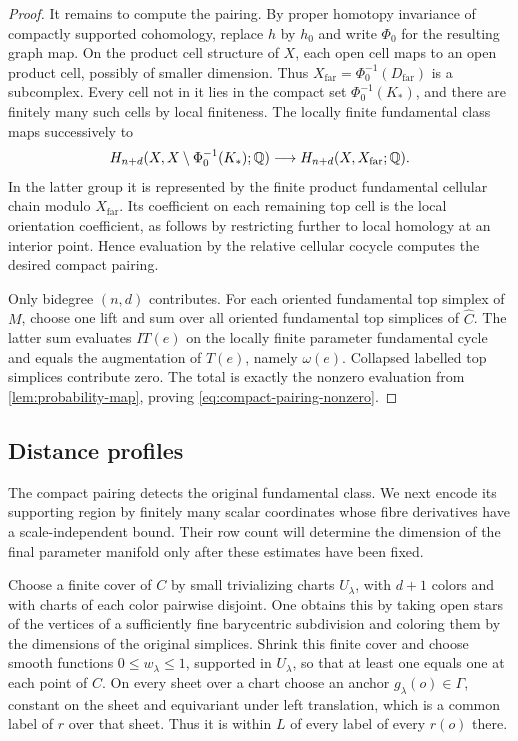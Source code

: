 \begin{proof}
It remains to compute the pairing.  By proper homotopy invariance of
compactly supported cohomology, replace $h$ by $h_0$ and write
$\Phi_0$ for the resulting graph map.  On the product cell structure
of $X$, each open cell maps to an open product cell, possibly of
smaller dimension.  Thus
$X_{\mathrm{far}}=\Phi_0^{-1}(D_{\mathrm{far}})$ is a subcomplex.
Every cell not in it lies in the compact set $\Phi_0^{-1}(K_*)$, and
there are finitely many such cells by local finiteness.  The locally
finite fundamental class maps successively to
\[
 H_{n+d}(X,X\setminus\Phi_0^{-1}(K_*);\mathbb Q)
 \longrightarrow H_{n+d}(X,X_{\mathrm{far}};\mathbb Q).
\]
In the latter group it is represented by the finite product
fundamental cellular chain modulo $X_{\mathrm{far}}$.  Its coefficient
on each remaining top cell is the local orientation coefficient,
as follows by restricting further to local homology at an interior
point.  Hence evaluation by the relative cellular cocycle computes
the desired compact pairing.

Only bidegree $(n,d)$ contributes.  For each oriented fundamental
top simplex of $M$, choose one lift and sum over all oriented
fundamental top simplices of $\widehat C$.  The latter sum evaluates
$IT(e)$ on the locally finite parameter fundamental cycle and equals
the augmentation of $T(e)$, namely $\omega(e)$.  Collapsed labelled
top simplices contribute zero.  The total is exactly the nonzero
evaluation from \cref{lem:probability-map}, proving
\cref{eq:compact-pairing-nonzero}.
\end{proof}

\subsection{Distance profiles}

The compact pairing detects the original fundamental class. We next encode
its supporting region by finitely many scalar coordinates whose fibre
derivatives have a scale-independent bound. Their row count will determine
the dimension of the final parameter manifold only after these estimates
have been fixed.

Choose a finite cover of $C$ by small trivializing charts $U_\lambda$,
with $d+1$ colors and with charts of each color pairwise disjoint.
One obtains this by taking open stars of the vertices of a sufficiently
fine barycentric subdivision and coloring them by the dimensions of
the original simplices.  Shrink this finite cover and choose smooth
functions $0\le w_\lambda\le1$, supported in $U_\lambda$, so that at
least one equals one at each point of $C$.  On every sheet over a chart
choose an anchor $g_\lambda(o)\in\Gamma$, constant on the sheet and
equivariant under left translation, which is a common label of $r$
over that sheet.  Thus it is within $L$ of every label of every $r(o)$
there.

